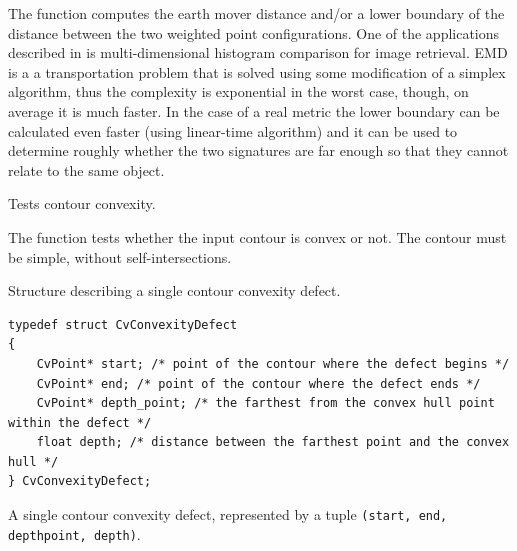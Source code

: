 The function computes the earth mover distance and/or
a lower boundary of the distance between the two weighted point
configurations. One of the applications described in  is
multi-dimensional histogram comparison for image retrieval. EMD is a a
transportation problem that is solved using some modification of a simplex
algorithm, thus the complexity is exponential in the worst case, though, on average
it is much faster. In the case of a real metric the lower boundary
can be calculated even faster (using linear-time algorithm) and it can
be used to determine roughly whether the two signatures are far enough
so that they cannot relate to the same object.

Tests contour convexity.


\begin{description}
\end{description}

The function tests whether the input contour is convex or not. The contour must be simple, without self-intersections.

\label{CvConvexityDefect}

\ifC
Structure describing a single contour convexity defect.

\begin{lstlisting}
typedef struct CvConvexityDefect
{
    CvPoint* start; /* point of the contour where the defect begins */
    CvPoint* end; /* point of the contour where the defect ends */
    CvPoint* depth_point; /* the farthest from the convex hull point within the defect */
    float depth; /* distance between the farthest point and the convex hull */
} CvConvexityDefect;
\end{lstlisting}
\else

A single contour convexity defect, represented by a tuple \texttt{(start, end, depthpoint, depth)}.

\begin{description}
\end{description}

